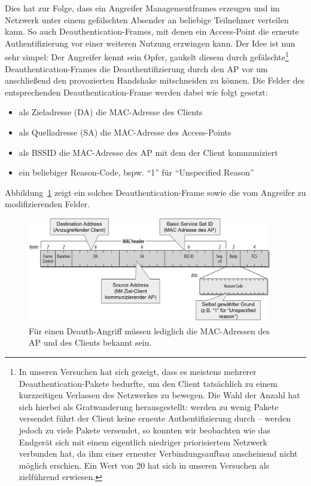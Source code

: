 Dies hat zur Folge, dass ein Angreifer Managementframes erzeugen und im Netzwerk unter einem gefälschten Absender an beliebige Teilnehmer verteilen kann.
So auch Deauthentication-Frames, mit denen ein Access-Point die erneute Authentifizierung vor einer weiteren Nutzung erzwingen kann. Der Idee ist nun sehr simpel: Der Angreifer kennt sein Opfer, gaukelt diesem durch gefälschte\footnote{In unseren Versuchen hat sich gezeigt, dass es meistens mehrerer Deauthentication-Pakete bedurfte, um den Client tatsächlich zu einem kurzzeitigen Verlassen des Netzwerkes zu bewegen. Die Wahl der Anzahl hat sich hierbei als Gratwanderung herausgestellt: werden zu wenig Pakete versendet führt der Client keine erneute Authentifizierung durch -- werden jedoch zu viele Pakete versendet, so konnten wir beobachten wie das Endgerät sich mit einem eigentlich niedriger priorisiertem Netzwerk verbunden hat, da ihm einer erneuter Verbindungsaufbau anscheinend nicht möglich erschien. Ein Wert von 20 hat sich in unseren Versuchen als zielführend erwiesen.} Deauthentication-Frames die Deauthentifizierung durch den AP vor um anschließend den provozierten Handshake mitschneiden zu können.
Die Felder des entsprechenden Deauthentication-Frame werden dabei wie folgt gesetzt:
\begin{itemize}
	\item als Zieladresse (DA) die MAC-Adresse des Clients
	\item als Quelladresse (SA) die MAC-Adresse des Access-Points
	\item als BSSID die MAC-Adresse des AP mit dem der Client kommuniziert
	\item ein beliebiger Reason-Code, bspw. \enquote{1} für \enquote{Unspecified Reason} \cite[S. 442]{ieee802.11}
\end{itemize}
Abbildung~\ref{fig:deauth-attack} zeigt ein solches Deauthentication-Frame sowie die vom Angreifer zu modifizierenden Felder.

\begin{figure}[ht]
	\centering
	\includegraphics[width=0.95\textwidth]{graphics/deauth-attack}
	\caption[Deauthentication-Frame]{Für einen Deauth-Angriff müssen lediglich die MAC-Adressen des AP und des Clients bekannt sein.}
	\label{fig:deauth-attack}
\end{figure}

